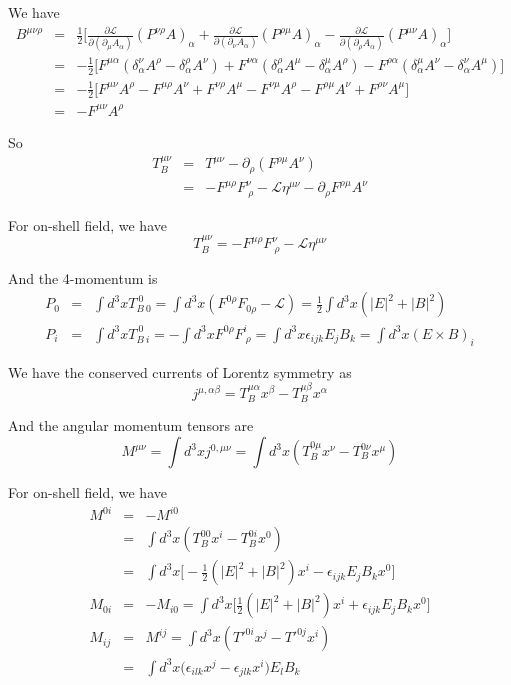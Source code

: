 \documentclass[12pt]{book}
\begin{document}
	We have
	\begin{eqnarray}
		B^{\mu\nu\rho}&=&\frac 12\Big[\frac{\partial\mathcal L}{\partial(\partial_\mu A_\alpha)}(P^{\nu\rho} A)_\alpha+\frac{\partial\mathcal L}{\partial(\partial_\nu A_\alpha)}(P^{\rho\mu} A)_\alpha-\frac{\partial\mathcal L}{\partial(\partial_\rho A_\alpha)}(P^{\mu\nu} A)_\alpha\Big]\\
		&=&-\frac 12\Big[F^{\mu\alpha}(\delta^\nu_\alpha A^\rho-\delta^\rho_\alpha A^\nu)+F^{\nu\alpha}(\delta^\rho_\alpha A^\mu-\delta^\mu_\alpha A^\rho)-F^{\rho\alpha}(\delta^\mu_\alpha A^\nu-\delta^\nu_\alpha A^\mu) \Big]\\
		&=&-\frac 12\Big[F^{\mu\nu} A^\rho-F^{\mu\rho} A^\nu+F^{\nu\rho} A^\mu-F^{\nu\mu} A^\rho-F^{\rho\mu} A^\nu+F^{\rho\nu} A^\mu \Big]\\
		&=&-F^{\mu\nu} A^\rho
	\end{eqnarray}
	
	So
	\begin{eqnarray}
		T_B^{\mu\nu}&=&T^{\mu\nu}-\partial_\rho(F^{\rho\mu} A^\nu)\\
		&=&-F^{\mu\rho}F^\nu_{\ \rho}-\mathcal{L}\eta^{\mu\nu}-\partial_\rho F^{\rho\mu} A^\nu
	\end{eqnarray}
	
	For on-shell field, we have
	\begin{equation}
		T_B^{\mu\nu}=-F^{\mu\rho}F^\nu_{\ \rho}-\mathcal{L}\eta^{\mu\nu}
	\end{equation}
	
	And the 4-momentum is
	\begin{eqnarray}
		P_0&=&\int d^3xT_{B\ 0}^{\ 0}=\int d^3x(F^{0\rho}F_{0\rho}-\mathcal{L})=\frac 12\int d^3x(|E|^2+|B|^2)\\
		P_i&=&\int d^3xT_{B\ i}^{\ 0}=-\int d^3xF^{0\rho}F^i_{\ \rho}=\int d^3x\epsilon_{ijk}E_jB_k=\int d^3x(E\times B)_i
	\end{eqnarray}
	
	We have the conserved currents of Lorentz symmetry as
	\begin{equation}
		j^{\mu,\alpha\beta}=T_B^{\mu\alpha}x^\beta-T_B^{\mu\beta}x^\alpha
	\end{equation}
	
	And the angular momentum tensors are
	\begin{equation}
		M^{\mu\nu}=\int d^3xj^{0,\mu\nu}=\int d^3x(T_B^{0\mu}x^\nu-T_B^{0\nu}x^\mu)
	\end{equation}
	
	For on-shell field, we have
	\begin{eqnarray}
		M^{0i}&=&-M^{i0}\\
		&=&\int d^3x(T_B^{00}x^i-T_B^{0i}x^0)\\
		&=&\int d^3x\big[-\frac 12(|E|^2+|B|^2)x^i-\epsilon_{ijk}E_jB_kx^0\big]\\
		M_{0i}&=&-M_{i0}=\int d^3x\big[\frac 12(|E|^2+|B|^2)x^i+\epsilon_{ijk}E_jB_kx^0\big]\\
		M_{ij}&=&M^{ij}=\int d^3x(T'^{0i}x^j-T'^{0j}x^i)\\
		&=&\int d^3x(\epsilon_{ilk}x^j-\epsilon_{jlk}x^i\big)E_lB_k
	\end{eqnarray}
	
\end{document}
